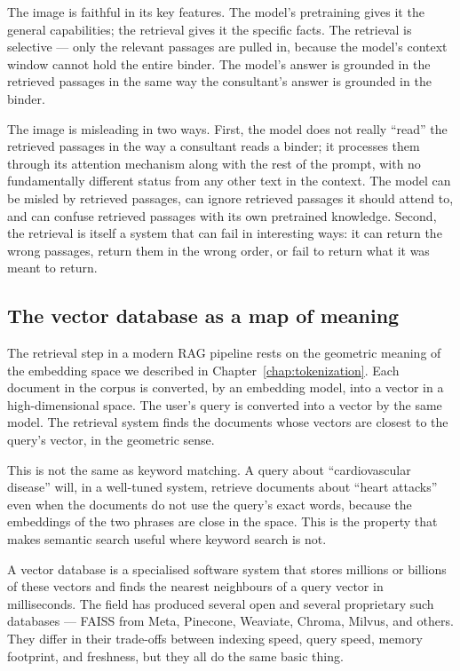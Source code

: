The image is faithful in its key features. The model's
pretraining gives it the general capabilities; the retrieval
gives it the specific facts. The retrieval is selective --- only
the relevant passages are pulled in, because the model's
context window cannot hold the entire binder. The model's
answer is grounded in the retrieved passages in the same way
the consultant's answer is grounded in the binder.

The image is misleading in two ways. First, the model does
not really ``read'' the retrieved passages in the way a
consultant reads a binder; it processes them through its
attention mechanism along with the rest of the prompt, with
no fundamentally different status from any other text in the
context. The model can be misled by retrieved passages, can
ignore retrieved passages it should attend to, and can confuse
retrieved passages with its own pretrained knowledge. Second,
the retrieval is itself a system that can fail in interesting
ways: it can return the wrong passages, return them in the
wrong order, or fail to return what it was meant to return.

\subsection*{The vector database as a map of meaning}

The retrieval step in a modern RAG pipeline rests on the
geometric meaning of the embedding space we described in
Chapter~\ref{chap:tokenization}. Each document in the corpus is converted, by an
embedding model, into a vector in a high-dimensional space.
The user's query is converted into a vector by the same
model. The retrieval system finds the documents whose vectors
are closest to the query's vector, in the geometric sense.

This is not the same as keyword matching. A query about
``cardiovascular disease'' will, in a well-tuned system,
retrieve documents about ``heart attacks'' even when the
documents do not use the query's exact words, because the
embeddings of the two phrases are close in the space. This
is the property that makes semantic search useful where
keyword search is not.

A vector database is a specialised software system that
stores millions or billions of these vectors and finds the
nearest neighbours of a query vector in milliseconds. The
field has produced several open and several proprietary such
databases --- FAISS from Meta, Pinecone, Weaviate, Chroma,
Milvus, and others. They differ in their trade-offs between
indexing speed, query speed, memory footprint, and
freshness, but they all do the same basic thing.

